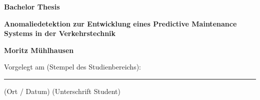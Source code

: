 %

%
\newcommand{\Bearbeiter}{Moritz Mühlhausen}
\newcommand{\Thema}{Anomaliedetektion zur Entwicklung eines Predictive Maintenance Systems in der Verkehrstechnik}
%
\thispagestyle{empty} 
%
\vspace{-20mm}
\begin{minipage}[t]{8cm}  
\end{minipage}
\hfill
{}
\vspace{30mm}
\begin{center}{\Huge\bf Bachelor Thesis} \par
\vspace{20mm}
{\LARGE\bf  \Thema} \par
\vspace{16mm}
{\LARGE\bf  \Bearbeiter} \par
\end{center}
% 
\vspace{15mm}
\begin{flushright}
    Vorgelegt am (Stempel des Studienbereichs): \\
    \vspace{20mm} %
    \rule[0ex]{\textwidth}{0.4pt} \hspace{5mm} (Ort / Datum) \hspace{30ex} (Unterschrift Student)
\end{flushright}
